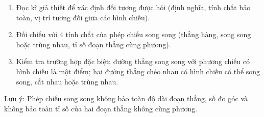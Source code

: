 \begin{enumerate}
\item Đọc kĩ giả thiết để xác định đối tượng được hỏi (định nghĩa, tính chất bảo toàn, vị trí tương đối giữa các hình chiếu).
\item Đối chiếu với 4 tính chất của phép chiếu song song (thẳng hàng, song song hoặc trùng nhau, tỉ số đoạn thẳng cùng phương).
\item Kiểm tra trường hợp đặc biệt: đường thẳng song song với phương chiếu có hình chiếu là một điểm; hai đường thẳng chéo nhau có hình chiếu có thể song song, cắt nhau hoặc trùng nhau.
\end{enumerate}
Lưu ý: Phép chiếu song song không bảo toàn độ dài đoạn thẳng, số đo góc và không bảo toàn tỉ số của hai đoạn thẳng không cùng phương.
